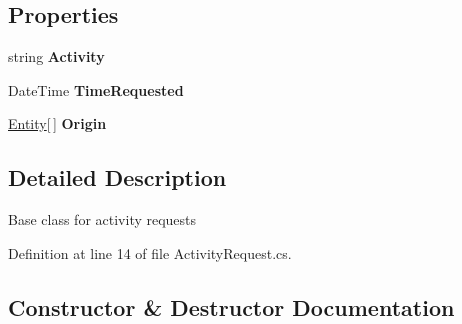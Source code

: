 \subsection*{Properties}
\begin{DoxyCompactItemize}
\item 
string {\bfseries Activity}\hypertarget{class_simulation_core_1_1_h_c_c_m_elements_1_1_activity_request_adaea96181232c55271200b3df20a2188}{}\label{class_simulation_core_1_1_h_c_c_m_elements_1_1_activity_request_adaea96181232c55271200b3df20a2188}

\item 
Date\+Time {\bfseries Time\+Requested}\hypertarget{class_simulation_core_1_1_h_c_c_m_elements_1_1_activity_request_ab944a48a04a4818b4cf2bf3c5fbcefa8}{}\label{class_simulation_core_1_1_h_c_c_m_elements_1_1_activity_request_ab944a48a04a4818b4cf2bf3c5fbcefa8}

\item 
\hyperlink{class_simulation_core_1_1_h_c_c_m_elements_1_1_entity}{Entity}\mbox{[}$\,$\mbox{]} {\bfseries Origin}\hypertarget{class_simulation_core_1_1_h_c_c_m_elements_1_1_activity_request_af7f58bb69405e8d1d03808b24aff6666}{}\label{class_simulation_core_1_1_h_c_c_m_elements_1_1_activity_request_af7f58bb69405e8d1d03808b24aff6666}

\end{DoxyCompactItemize}


\subsection{Detailed Description}
Base class for activity requests 



Definition at line 14 of file Activity\+Request.\+cs.



\subsection{Constructor \& Destructor Documentation}
